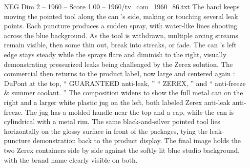 \begin{textsample}{NEG Dim 2 – 1960 – Score 1.00 – 1960/tv\_com\_1960\_86.txt}
The hand keeps moving the pointed tool along the can ’s side, making or touching several leak points.
Each puncture produces a sudden spray, with water-like lines shooting across the blue background.
As the tool is withdrawn, multiple arcing streams remain visible, then some thin out, break into streaks, or fade.
The can ’s left edge stays steady while the sprays flare and diminish to the right, visually demonstrating pressurized leaks being challenged by the Zerex solution.
The commercial then returns to the product label, now large and centered again : DuPont at the top, “ GUARANTEED anti-leak, ” “ ZEREX, ” and “ anti-freeze \& summer coolant. ” The composition widens to show the full metal can on the right and a larger white plastic jug on the left, both labeled Zerex anti-leak anti-freeze.
The jug has a molded handle near the top and a cap, while the can is cylindrical with a metal rim.
The same black-and-silver pointed tool lies horizontally on the glossy surface in front of the packages, tying the leak-puncture demonstration back to the product display.
The final image holds the two Zerex containers side by side against the softly lit blue studio background, with the brand name clearly visible on both.

\end{textsample}
